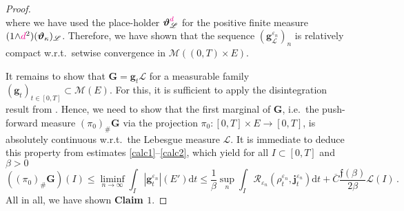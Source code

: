 \documentclass[11pt,reqno]{amsart}
\numberwithin{equation}{section}
\newcommand{\calM}{\mathcal{M}}
\newcommand{\scrL}{\mathscr{L}}
\newcommand{\eps}{\varepsilon}
\newcommand{\dd}{\mathrm{d}}
\theoremstyle{definition}
\newcommand{\ep}{\varepsilon}
\let\eps\ep
\def\dd{\mathrm{d}}
\newcommand{\teta}{\boldsymbol \vartheta}
\newcommand{\tetapi}{\boldsymbol{\teta}_{\kappa}}
\newcommand{\Lebone}{\scrL}
\newcommand{\bj}{{\boldsymbol j}}
\newcommand{\scrR}{\mathscr{R}}
\newcommand{\bg}{{\boldsymbol{g}}}
\newcommand{\bG}{{\boldsymbol{G}}}
\newcommand{\Ed}{{E'}}
\newcommand{\ej}{\eps_n}
\newcommand{\psih}{\mathfrak{f}}%
\newcommand{\RNEW}{\color{black}} %
\newcommand{\RRR}{\color{magenta}}
\newcommand{\EEE}{\color{black}}
\newcommand{\dpi}{{\color{magenta} d}}
\numberwithin{equation}{section}
\begin{document}
\begin{proof}
\begin{equation}
   \end{equation}
   where we have used the place-holder $\teta_\Lebone^{\dpi}$ for the positive finite measure $ (1{\wedge}\dpi^2)(\tetapi)_\Lebone$.
   Therefore, we have shown that the sequence $(\bg_{\Lebone}^{\ej})_n$ is relatively compact w.r.t.\ setwise convergence in \RNEW $\calM((0,T){\times} E)$. \EEE
   \par
   \RNEW It remains to show that $\bG = \bg_t \Lebone$ for a measurable family $(\bg_t)_{t\in[0,T]} \subset \calM(E)$.
   For this, it is sufficient to 
    apply the disintegration result from  \cite[Cor.\ 10.4.15]{Bogachev07}. Hence, we need to 
   show that the first marginal  of $\bG$, i.e.\ the push-forward measure $(\pi_0)_{\#}\bG$ via the projection $\pi_0: [0,T]{\times}E
   \to [0,T]$, is absolutely continuous w.r.t.\ the Lebesgue measure $\Lebone$. 
    It is immediate to deduce this property from  
  estimates \eqref{calc1}--\eqref{calc2}, 
  which yield for all $I\subset [0,T]$ and $\beta>0$
  \[
  ((\pi_0)_{\#}\bG) (I) \leq \liminf_{n\to\infty} \int_I   |\bg_t^{\ej}|(\Ed)  \dd t 
  \leq \frac1{\beta} \sup_n \int_I \scrR_{\ej} (\rho_t^{\ej}, \bj_t^{\ej}) \dd t +  \overline{C} \frac{ \psih(\beta)}{ 2\beta} \Lebone(I) \,.
  \]
   All in all, we have shown
   {\bf Claim $1$}.  \EEE
  \medskip

\end{proof}
\end{document}
